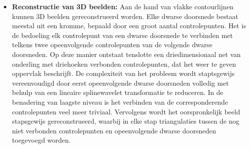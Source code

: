 \begin{enumerate}
{\begin{itemize}
		\item \textbf{Reconstructie van 3D beelden:} Aan de hand van vlakke contourlijnen kunnen 3D beelden gereconstrueerd worden. Elke dwarse doorsnede bestaat meestal uit een kromme, bepaald door een groot aantal controlepunten. Het is de bedoeling elk controlepunt van een dwarse doorsnede te verbinden met telkens twee opeenvolgende controlepunten van de volgende dwarse doorsneden. Op deze manier ontstaat tenslotte een driedimensionaal net van onderling met driehoeken verbonden controlepunten, dat het weer te geven oppervlak beschrijft. De complexiteit van het probleem wordt staptsgewijs vereenvoudigd door eerst opeenvolgende dwarse doorsneden volledig met behulp van een lineaire splinewavelet transformatie te reduceren. In de benadering van laagste niveau is het verbinden van de corresponderende controlepunten veel meer triviaal. Vervolgens wordt het oorspronkelijk beeld stapsgewijs gereconstrueerd, waarbij in elke stap triangulaties tussen de nog niet verbonden controlepunten en opeenvolgende dwarse doorsneden toegevoegd worden.
	\end{itemize}}
			

\end{enumerate}
